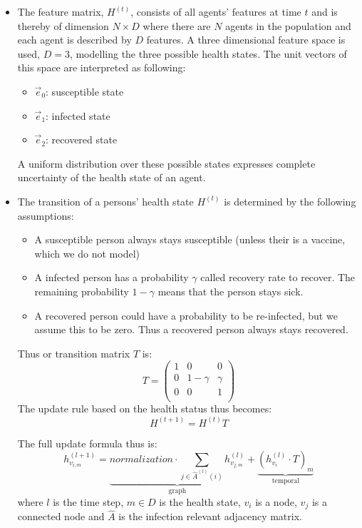 \documentclass[]{article}
\begin{document}
\begin{itemize}
\begin{itemize}
	\end{itemize}
	\item The feature matrix, $H^{(t)}$, consists of all agents' features at time $t$ and is thereby of dimension $N\times D$ where there are $N$ agents in the population and each agent is described by $D$ features. A three dimensional feature space is used, $D=3$, modelling the three possible health states. The unit vectors of this space are interpreted as following:
	\begin{itemize}
		\item $\vec{e}_0$: susceptible state
		\item $\vec{e}_1$: infected state
		\item $\vec{e}_2$: recovered state
	\end{itemize}
	A uniform distribution over these possible states expresses complete uncertainty of the health state of an agent.
	\item The transition of a persons' health state $H^{(t)}$ is determined by the following assumptions:
	\begin{itemize}
		\item A susceptible person always stays susceptible (unless their is a vaccine, which we do not model)
		\item A infected person has a probability $\gamma$ called recovery rate to recover. The remaining probability $1-\gamma$ means that the person stays sick.
		\item A recovered person could have a probability to be re-infected, but we assume this to be zero. Thus a recovered person always stays recovered.
	\end{itemize}
	Thus or transition matrix $T$ is:
	\begin{equation}
		T = 
		\begin{pmatrix}
			1 &     0    & 0      \\
			0 & 1-\gamma & \gamma \\
			0 &     0    & 1      \\
		\end{pmatrix}
	\end{equation}
	The update rule based on the health status thus becomes:
	\begin{equation}
		H^{(t+1)} = H^{(t)} T
	\end{equation}

	The full update formula thus is:
	\begin{equation}
		h_{v_{i,m}}^{(l+1)}
		 = 
		\underbrace{
			normalization \cdot \sum_{j \in \hat{A}^{(l)}(i)} h^{(l)}_{v_{j,m}}
		}_{\text{graph}} +
		\underbrace{
			(h^{(l)}_{v_{i}} \cdot T)_m 
		}_{\text{temporal}}
	\end{equation}
	where $l$ is the time step, $m \in D$ is the health state, $v_i$ is a node, $v_j$ is a connected node and $\hat{A}$ is the infection relevant adjacency matrix.
\end{itemize}
\end{document}

